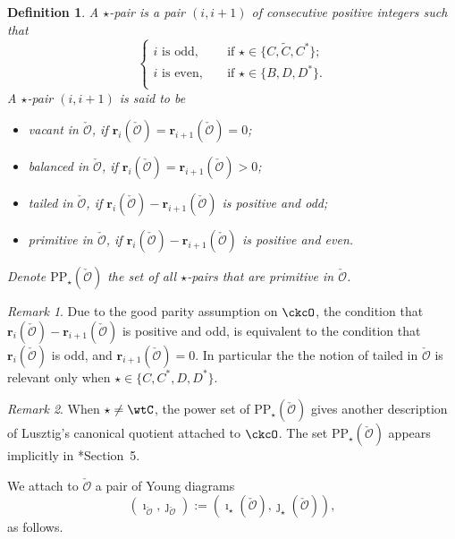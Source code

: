 \documentclass[11pt,a4paper]{amsart}
\newcommand{\CO}{{\mathcal {O}}}
\numberwithin{equation}{section}
\newtheorem{defn}[thm]{Definition}
\theoremstyle{remark}
\newtheorem*{remark}{Remark}
\begin{document}
\begin{defn}
 A $\star$-pair is a pair  $(i,i+1)$ of consecutive positive integers such that
\[
   \left\{
     \begin{array}{ll}
      i\textrm{ is odd}, \quad &\textrm{if $\star\in\{C, \widetilde{C}, C^*\}$};  \\
      i \textrm{ is even}, \quad &\textrm{if $\star\in\{B, D, D^*\}$}. \\
       \end{array}
   \right.
\]
A $\star$-pair   $(i,i+1)$ is said to be
\begin{itemize}
\item
vacant in $\check \CO$, if $\mathbf r_i(\check \CO)=\mathbf r_{i+1}(\check \CO)=0$;
\item
balanced in $\check \CO$,  if  $\mathbf r_i(\check \CO)=\mathbf r_{i+1}(\check \CO)>0$;
\item
tailed in $\check \CO$,  if  $\mathbf r_i(\check \CO)-\mathbf r_{i+1}(\check \CO)$ is positive and odd;
\item
primitive in $\check \CO$, if    $\mathbf r_i(\check \CO)-\mathbf r_{i+1}(\check \CO)$ is positive and even.
\end{itemize}
Denote $\mathrm{PP}_\star(\check \CO)$ the  set of all $\star$-pairs that are primitive in $\check \CO$.
\end{defn}

\begin{remark} Due to the good parity assumption on $\ckcO$, the condition that
$\mathbf r_i(\check \CO)-\mathbf r_{i+1}(\check \CO)$ is positive and odd, is equivalent to the condition that $\mathbf r_i(\check \CO)$ is odd, and $\mathbf r_{i+1}(\check \CO)=0$. In particular the the notion of tailed in $\check \CO$ is relevant only when $\star\in\{C,C^*,D,D^*\}$.
\end{remark}

\begin{remark} When $\star\neq \wtC$, %
the power set of $\mathrm{PP}_\star(\check \CO)$ gives another description of Lusztig's canonical
  quotient attached to $\ckcO$. The set $\mathrm{PP}_{\star}(\check\CO)$ appears implicitly in
\cite{So}*{Section~5}.
\end{remark}

We attach to $\check \CO$ a pair of Young diagrams
\begin{equation}\label{ijO}
(\imath_{\check \CO}, \jmath_{\check \CO}):=(\imath_\star(\check \CO), \jmath_\star(\check \CO)),
\end{equation}
 as follows.
\end{document}
